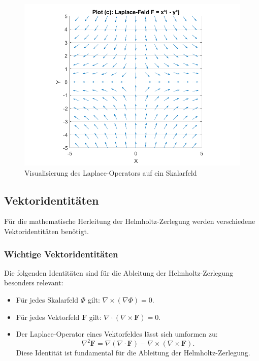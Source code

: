 \begin{figure}
    \centering
    \includegraphics[scale=0.4]{papers/helmholtz/images/Laplace_Feld.png}
    \caption{Visualisierung des Laplace-Operators auf ein Skalarfeld}
    \label{fig:LaplaceAlg}
\end{figure}


\subsection{Vektoridentitäten
\label{helmholtz:subsection:Vektoridentitaeten}}
Für die mathematische Herleitung der Helmholtz-Zerlegung werden verschiedene Vektoridentitäten benötigt.

\subsubsection{Wichtige Vektoridentitäten}

Die folgenden Identitäten sind für die Ableitung der Helmholtz-Zerlegung besonders relevant:

\begin{itemize}
\item Für jedes Skalarfeld $\Phi$ gilt: $\nabla \times (\nabla \Phi) = 0$.
\item Für jedes Vektorfeld $\boldsymbol{F}$ gilt: $\nabla \cdot (\nabla \times \boldsymbol{F}) = 0$.
\item Der Laplace-Operator eines Vektorfeldes lässt sich umformen zu:
\begin{equation}
\nabla^2 \boldsymbol{F} = \nabla(\nabla \cdot \boldsymbol{F}) - \nabla \times (\nabla \times \boldsymbol{F}).
\end{equation}
Diese Identität ist fundamental für die Ableitung der Helmholtz-Zerlegung.
\end{itemize}




